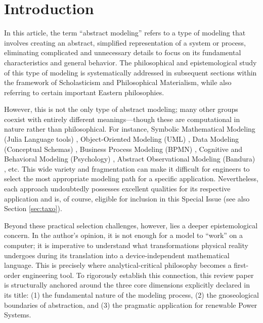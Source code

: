 \documentclass[11pt, a4paper]{article}
\begin{document}
\begin{abstract}
\vspace{0.5cm}
\noindent \textbf{Keywords:}
abstract modeling; philosophical materialism; theory of categorical closure; synthetic identity; regressus-progressus loop; systems theory; DC microgrids; power dynamics category; H-bus emergence; cyber-physical security.
\end{abstract}

\section*{Introduction}

In this article, the term “abstract modeling” refers to a type of modeling that involves creating an abstract, simplified representation of a system or process, eliminating complicated and unnecessary details to focus on its fundamental characteristics and general behavior. The philosophical and epistemological study of this type of modeling is systematically addressed in subsequent sections within the framework of Scholasticism and Philosophical Materialism, while also referring to certain important Eastern philosophies.

However, this is not the only type of abstract modeling; many other groups coexist with entirely different meanings—though these are computational in nature rather than philosophical. For instance, Symbolic Mathematical Modeling (Julia Language tools) \cite{ma2021modelingtoolkit}, Object-Oriented Modeling (UML) \cite{rumbaugh2004uml}, Data Modeling (Conceptual Schemas) \cite{chen1976entity}, Business Process Modeling (BPMN) \cite{omg2013bpmn202}, Cognitive and Behavioral Modeling (Psychology) \cite{farrell2018computational}, Abstract Observational Modeling (Bandura) \cite{bandura1986social}, etc. This wide variety and fragmentation can make it difficult for engineers to select the most appropriate modeling path for a specific application. Nevertheless, each approach undoubtedly possesses excellent qualities for its respective application and is, of course, eligible for inclusion in this Special Issue (see also Section \ref{sec:taxo}).

Beyond these practical selection challenges, however, lies a deeper epistemological concern. In the author's opinion, it is not enough for a model to “work” on a computer; it is imperative to understand what transformations physical reality undergoes during its translation into a device-independent mathematical language. This is precisely where analytical-critical philosophy becomes a first-order engineering tool. To rigorously establish this connection, this review paper is structurally anchored around the three core dimensions explicitly declared in its title: (1) the fundamental nature of the modeling process, (2) the gnoseological boundaries of abstraction, and (3) the pragmatic application for renewable Power Systems.
\end{document}

